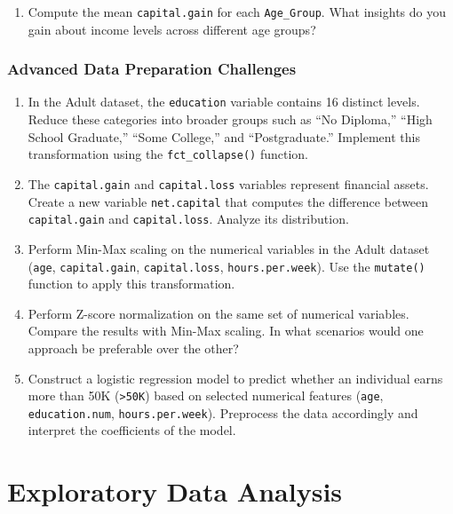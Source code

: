 \documentclass[
  11pt,
]{book}
\providecommand{\tightlist}{%
  \setlength{\itemsep}{0pt}\setlength{\parskip}{0pt}}
\theoremstyle{definition}
\theoremstyle{definition}
\theoremstyle{definition}
\theoremstyle{definition}
\theoremstyle{remark}
\begin{document}
\begin{enumerate}
\def\labelenumi{\arabic{enumi}.}
\setcounter{enumi}{14}
\tightlist
\item
  Compute the mean \texttt{capital.gain} for each \texttt{Age\_Group}. What insights do you gain about income levels across different age groups?
\end{enumerate}

\subsection*{Advanced Data Preparation Challenges}\label{advanced-data-preparation-challenges}


\begin{enumerate}
\def\labelenumi{\arabic{enumi}.}
\setcounter{enumi}{15}
\item
  In the Adult dataset, the \texttt{education} variable contains 16 distinct levels. Reduce these categories into broader groups such as ``No Diploma,'' ``High School Graduate,'' ``Some College,'' and ``Postgraduate.'' Implement this transformation using the \texttt{fct\_collapse()} function.
\item
  The \texttt{capital.gain} and \texttt{capital.loss} variables represent financial assets. Create a new variable \texttt{net.capital} that computes the difference between \texttt{capital.gain} and \texttt{capital.loss}. Analyze its distribution.
\item
  Perform Min-Max scaling on the numerical variables in the Adult dataset (\texttt{age}, \texttt{capital.gain}, \texttt{capital.loss}, \texttt{hours.per.week}). Use the \texttt{mutate()} function to apply this transformation.
\item
  Perform Z-score normalization on the same set of numerical variables. Compare the results with Min-Max scaling. In what scenarios would one approach be preferable over the other?
\item
  Construct a logistic regression model to predict whether an individual earns more than 50K (\texttt{\textgreater{}50K}) based on selected numerical features (\texttt{age}, \texttt{education.num}, \texttt{hours.per.week}). Preprocess the data accordingly and interpret the coefficients of the model.
\end{enumerate}

\chapter{Exploratory Data Analysis}\label{chapter-EDA}
\end{document}
